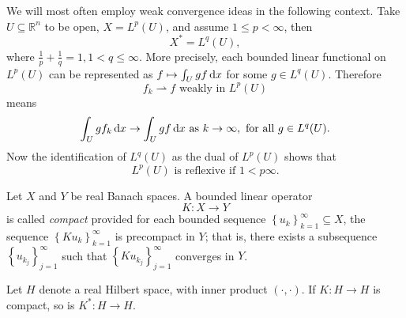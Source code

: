 \begin{example}
  \label{example-weak-convergence}
  We will most often employ weak convergence ideas in the following context.
  Take \( U \subseteq \mathbb{R}^n \) to be open, \( X = L^p(U) \), and assume \( 1 \leq p < \infty \), then
  \[
    X^* = L^q(U),
  \]
  where \( \frac{1}{p} + \frac{1}{q} = 1, 1 < q \leq \infty \).
  More precisely, each bounded linear functional on \( L^p(U) \) can be represented as \( f \mapsto \int_{U} g f \mathop{}\!\mathrm{d} x \) for some \( g \in L^q(U) \).
  Therefore
  \[
    f_k \rightharpoonup f \text{ weakly in } L^p(U)
  \]
  means
  \[
    \int_U gf_k \mathop{}\!\mathrm{d} x \to \int_U gf \mathop{}\!\mathrm{d} x \text{ as } k \to \infty, \text{ for all } g \in L^q(U).
  \]
  Now the identification of \( L^q(U) \) as the dual of \( L^p(U) \) shows that
  \[
    L^p(U) \text{ is reflexive if } 1 < p \infty.
  \]
\end{example}

\begin{definition}
  \label{definition-compact-operator}
  Let \( X \) and \( Y \) be real Banach spaces.
  A bounded linear operator
  \[
    K: X \to Y
  \]
  is called \emph{compact} provided for each bounded sequence \( \left\lbrace u_k \right\rbrace_{k = 1}^{\infty} \subseteq X \), the sequence \( \left\lbrace K u_k \right\rbrace_{k = 1}^\infty \) is precompact in \( Y \);
  that is, there exists a subsequence \( \left\lbrace u_{k_j} \right\rbrace_{j = 1}^{\infty} \) such that \( \left\lbrace K u_{k_j} \right\rbrace_{j = 1}^\infty \) converges in \( Y \).
\end{definition}

\begin{theorem}
  Let \( H \) denote a real Hilbert space, with inner product \( (\cdot, \cdot) \).
  If \( K: H \to H \) is compact, so is \( K^*: H \to H \).
\end{theorem}

